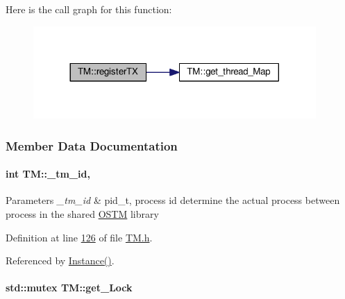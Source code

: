 Here is the call graph for this function\+:\nopagebreak
\begin{figure}[H]
\begin{center}
\leavevmode
\includegraphics[width=305pt]{class_t_m_a26ea481c24d9aa3aebd6dafb7253376e_a26ea481c24d9aa3aebd6dafb7253376e_cgraph}
\end{center}
\end{figure}




\subsubsection{Member Data Documentation}
\paragraph[{\texorpdfstring{\+\_\+tm\+\_\+id}{_tm_id}}]{\setlength{\rightskip}{0pt plus 5cm}int T\+M\+::\+\_\+tm\+\_\+id\hspace{0.3cm}{\ttfamily [static]}, {\ttfamily [private]}}\hypertarget{class_t_m_a6fb90615393f9205838e302c714bbd60_a6fb90615393f9205838e302c714bbd60}{}\label{class_t_m_a6fb90615393f9205838e302c714bbd60_a6fb90615393f9205838e302c714bbd60}

\begin{DoxyParams}{Parameters}
{\em \+\_\+tm\+\_\+id} & pid\+\_\+t, process id determine the actual process between process in the shared \hyperlink{class_o_s_t_m}{O\+S\+TM} library \\
\hline
\end{DoxyParams}


Definition at line \hyperlink{_t_m_8h_source_l00126}{126} of file \hyperlink{_t_m_8h_source}{T\+M.\+h}.



Referenced by \hyperlink{_t_m_8cpp_source_l00028}{Instance()}.

\paragraph[{\texorpdfstring{get\+\_\+\+Lock}{get_Lock}}]{\setlength{\rightskip}{0pt plus 5cm}std\+::mutex T\+M\+::get\+\_\+\+Lock\hspace{0.3cm}{\ttfamily [private]}}\hypertarget{class_t_m_a123bc5aa0766a7b909bebc54a429e5b0_a123bc5aa0766a7b909bebc54a429e5b0}{}\label{class_t_m_a123bc5aa0766a7b909bebc54a429e5b0_a123bc5aa0766a7b909bebc54a429e5b0}

